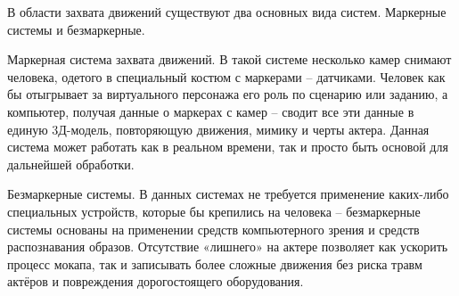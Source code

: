 В области захвата движений существуют два основных вида систем. Маркерные системы и безмаркерные.

Маркерная система захвата движений. В такой системе несколько камер снимают человека, одетого в специальный костюм с маркерами – датчиками. Человек как бы отыгрывает за виртуального персонажа его роль по сценарию или заданию, а компьютер, получая данные о маркерах с камер – сводит все эти данные в единую 3Д-модель, повторяющую движения, мимику и черты актера. Данная система может работать как в реальном времени, так и просто быть основой для дальнейшей обработки.

Безмаркерные системы. В данных системах не требуется применение каких-либо специальных устройств, которые бы крепились на человека – безмаркерные системы основаны на применении средств компьютерного зрения и средств распознавания образов. Отсутствие «лишнего» на актере позволяет как ускорить процесс мокапа, так и записывать более сложные движения без риска травм актёров и повреждения дорогостоящего оборудования.

